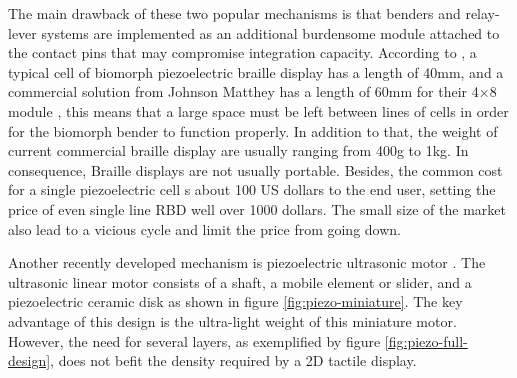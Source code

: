 The main drawback of these two popular mechanisms is that benders and relay-lever systems are implemented as an additional burdensome module attached to the contact pins that may compromise integration capacity. According to 
\cite{di_bucchianico_survey_2018}, a typical cell of biomorph piezoelectric braille display has a length of 40mm, and a commercial solution from Johnson Matthey has a length of 60mm for their 4×8 module \cite{JM_braille_display}, this means that a large space must be left between lines of cells in order for the biomorph bender to function properly. In addition to that, the weight of current commercial braille display are usually ranging from 400g to 1kg.
In consequence, Braille displays are not usually portable. Besides, the common cost for a single piezoelectric cell s about 100 US dollars to the end user, setting the price of even single line RBD well over 1000 dollars. The small size of the market also lead to a vicious cycle and limit the price from going down.

Another recently developed mechanism is piezoelectric ultrasonic motor \cite{hernandez_characterization_2009}.
The ultrasonic linear motor consists of a shaft, a mobile element or slider, and a piezoelectric ceramic disk as shown in figure \ref{fig:piezo-miniature}.
The key advantage of this design is the ultra-light weight of this miniature motor.
However, the need for several layers, as exemplified by figure \ref{fig:piezo-full-design}, does not befit the density required by a 2D tactile display.

